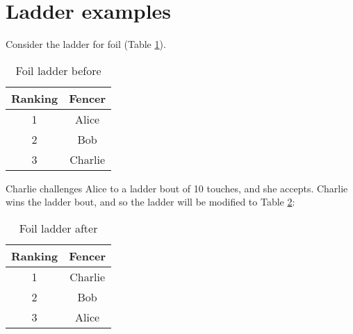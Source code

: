 \documentclass{article}
\begin{document}
\section{Ladder examples}
Consider the ladder for foil (Table \ref{tab:foil}).
\begin{table}[ht]
    \centering
    \begin{tabular}{|c|c|}
        \hline
        Ranking & Fencer \\ \hline
        1 & Alice \\ \hline
        2 & Bob \\ \hline
        3 & Charlie \\ \hline
    \end{tabular}
    \caption{Foil ladder before}
    \label{tab:foil}
\end{table}
Charlie challenges Alice to a ladder bout of 10 touches, and she accepts. Charlie wins the ladder bout, and so the ladder will be modified to Table \ref{tab:foil2}:
\begin{table}[ht]
    \centering
    \begin{tabular}{|c|c|}
        \hline
        Ranking & Fencer \\ \hline
        1 & Charlie \\ \hline
        2 & Bob \\ \hline
        3 & Alice \\ \hline
    \end{tabular}
    \caption{Foil ladder after}
    \label{tab:foil2}
\end{table}
\end{document}
